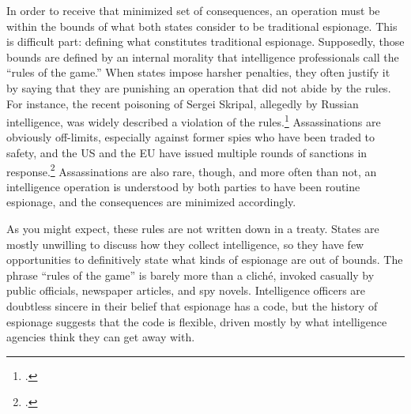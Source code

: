 \documentclass{memoir}
\begin{document}
\begin{refsegment}



In order to receive that minimized set of consequences, an operation must be within the bounds of what both states consider to be traditional espionage. This is difficult part: defining what constitutes traditional espionage. Supposedly, those bounds are defined by an internal morality that intelligence professionals call the ``rules of the game.'' When states impose harsher penalties, they often justify it by saying that they are punishing an operation that did not abide by the rules. For instance, the recent poisoning of Sergei Skripal, allegedly by Russian intelligence, was widely described a violation of the rules.\footcite{masters_has_2018} Assassinations are obviously off-limits, especially against former spies who have been traded to safety, and the US and the EU have issued multiple rounds of sanctions in response.\footcite{reuters_e.u._2019} Assassinations are also rare, though, and more often than not, an intelligence operation is understood by both parties to have been routine espionage, and the consequences are minimized accordingly.

As you might expect, these rules are not written down in a treaty. States are mostly unwilling to discuss how they collect intelligence, so they have few opportunities to definitively state what kinds of espionage are out of bounds.  The phrase ``rules of the game'' is barely more than a clich\'e, invoked casually by public officials, newspaper articles, and spy novels. Intelligence officers are doubtless sincere in their belief that espionage has a code, but the history of espionage suggests that the code is flexible, driven mostly by what intelligence agencies think they can get away with.


\end{refsegment}
\end{document}
